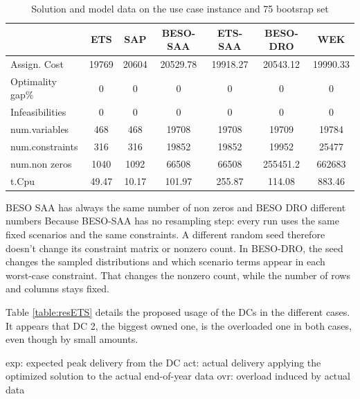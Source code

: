 \documentclass[mnsc,sglanonrev]{informs4}  %
\theoremstyle{remark}\newtheorem{remark}{Remark}
\begin{document}
\begingroup
\renewcommand{\arraystretch}{0.8}
\begin{table}
	\centering
	\begin{tabular}{l|cccccc|}
		                  &  ETS  &    SAP   & BESO-SAA &  ETS-SAA & BESO-DRO & WEK  \\
		\hline
		Assign. Cost      & 19769 & 20604 &  20529.78 & 19918.27 &  20543.12 & 19990.33\\
		Optimality gap\%  &    0  &    0     & 0        &  0       & 0        & 0\\
		Infeasibilities   &    0  &    0     & 0        &  0       & 0        & 0\\
        num.variables     &   468 &    468   & 19708    &   19708  & 19709    & 19784\\
        num.constraints   &   316 &    316   & 19852    &   19852  & 19952    & 25477\\
        num.non zeros     &  1040 &    1092  & 66508    &   66508  & 255451.2   & 662683\\
		t.Cpu             & 49.47 &    10.17 &  101.97  &   255.87 &  114.08  & 883.46\\
		\hline
	\end{tabular}
	\caption{Solution and model data on the use case instance and 75 bootsrap set}
	\label{table:compETS}
\end{table}
\endgroup

BESO SAA has always the same number of non zeros and BESO DRO different numbers Because BESO-SAA has no resampling step: every run uses the same fixed scenarios and the same constraints. A different random seed therefore doesn’t change its constraint matrix or nonzero count.
In BESO-DRO, the seed changes the sampled distributions and which scenario terms appear in each worst-case constraint. That changes the nonzero count, while the number of rows and columns stays fixed.


Table \ref{table:resETS} details the proposed usage of the  DCs in the different cases. It appears that DC 2, the biggest owned one, is the overloaded one in both cases, even though by small amounts. 

exp: expected peak delivery from the DC
act: actual delivery applying the optimized solution to the actual end-of-year data
ovr: overload induced by actual data
\end{document}
